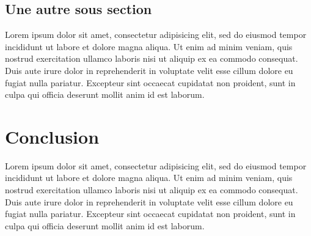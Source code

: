 \subsection{Une autre sous section}
Lorem ipsum dolor sit amet, consectetur adipisicing elit, sed do eiusmod
tempor incididunt ut labore et dolore magna aliqua. Ut enim ad minim veniam,
quis nostrud exercitation ullamco laboris nisi ut aliquip ex ea commodo
consequat. Duis aute irure dolor in reprehenderit in voluptate velit esse
cillum dolore eu fugiat nulla pariatur. Excepteur sint occaecat cupidatat non
proident, sunt in culpa qui officia deserunt mollit anim id est laborum.

\section{Conclusion}
Lorem ipsum dolor sit amet, consectetur adipisicing elit, sed do eiusmod
tempor incididunt ut labore et dolore magna aliqua. Ut enim ad minim veniam,
quis nostrud exercitation ullamco laboris nisi ut aliquip ex ea commodo
consequat. Duis aute irure dolor in reprehenderit in voluptate velit esse
cillum dolore eu fugiat nulla pariatur. Excepteur sint occaecat cupidatat non
proident, sunt in culpa qui officia deserunt mollit anim id est laborum.